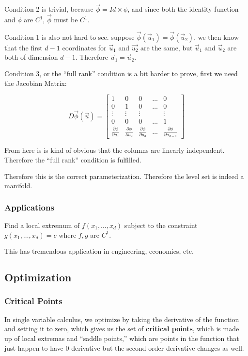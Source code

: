 \documentclass[11 pt, twoside]{article}
\begin{document}
Condition 2 is trivial, because $\vec{\phi} = Id \times \phi$, and since both
the identity function and $\phi$ are $C^1$, $\vec{\phi}$ must be $C^1$.

Condition 1 is also not hard to see. suppose $\vec{\phi}(\vec{u}_1) =
\vec{\phi}(\vec{u}_2)$, we then know that the first $d-1$ coordinates for
$\vec{u}_1$ and $\vec{u_2}$ are the same, but $\vec{u}_1$ and $\vec{u}_2$ are
both of dimension $d - 1$. Therefore $\vec{u}_1 = \vec{u}_2$.

Condition 3, or the ``full rank'' condition is a bit harder to prove, first we
need the Jacobian Matrix:

\[
D\vec{\phi}(\vec{u}) =
\left[\begin{array}{ccccc}
1 & 0 & 0 & \dots & 0 \\
0 & 1 & 0 & \dots & 0 \\
\vdots & \vdots & \vdots & & \vdots\\
0 & 0 & 0 & \dots & 1 \\
\frac{\partial \phi}{\partial u_1} & \frac{\partial \phi}{\partial u_2}
& \frac{\partial \phi}{\partial u_3} & \dots &
\frac{\partial \phi}{\partial u_{d - 1}}
\end{array}\right]
\]

From here is is kind of obvious that the columns are linearly independent.
Therefore the ``full rank'' condition is fulfilled.

Therefore this is the correct parameterization. Therefore the level set is indeed a manifold.

\subsubsection{Applications}
Find a local extremum of $f(x_1, \dots, x_d)$ subject to the constraint $g(x_1,
\dots, x_d) = c$ where $f, g$ are $C^1$.

This has tremendous application in engineering, economics, etc.
\subsection{Optimization}
\subsubsection{Critical Points}
In single variable calculus, we optimize by taking the derivative of the
function and setting it to zero, which gives us the set of \textbf{critical
points}, which is made up of local extremas and ``saddle points,'' which are
points in the function that just happen to have 0 derivative but the second
order derivative changes as well.
\end{document}
